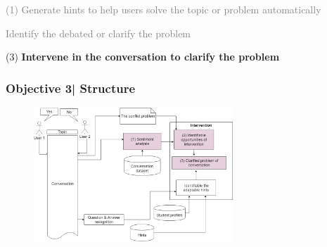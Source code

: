 \documentclass{beamer}
\begin{document}


\begin{frame}
\par 	\textcolor{gray}{(1)  Generate hints to help users solve the topic or problem automatically}
\par \textcolor{gray}{Identify the debated or clarify the problem }
\par (3) \textbf{ Intervene in the conversation to clarify the problem }
\end{frame}
\begin{frame}
\frametitle{Objective 3| Structure}


\begin{figure}
	\includegraphics[width=75mm]{58.png}	
	
	
	

\end{figure}

\end{frame}
\end{document}

